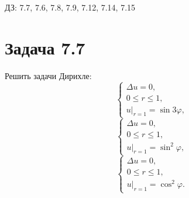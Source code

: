 \documentclass[11pt]{article}
\author{Sergey Makarov}
\date{\today}
\title{}
\def\zall{\setcounter{lem}{0}\setcounter{cnsqnc}{0}\setcounter{th}{0}\setcounter{Cmt}{0}\setcounter{equation}{0}}
\newcounter{lem}\setcounter{lem}{0}
\newcounter{th}\setcounter{th}{0}
\newcounter{cnsqnc}\setcounter{cnsqnc}{0}
\newcounter{Cmt}\setcounter{Cmt}{0}
\begin{document}
\zall

ДЗ: 7.7, 7.6, 7.8, 7.9, 7.12, 7.14, 7.15
\section{Задача 7.7}
\label{sec:org857e419}
Решить задачи Дирихле:
\begin{equation}
\begin{cases}
\Delta u = 0, \\
0 \leq r \leq 1, \\
u|_{r = 1} = \sin 3\varphi,
\end{cases}
\end{equation}
\begin{equation}
\begin{cases}
\Delta u = 0, \\
0 \leq r \leq 1, \\
u|_{r = 1} = \sin^2\varphi,
\end{cases}
\end{equation}
\begin{equation}
\begin{cases}
\Delta u = 0, \\
0 \leq r \leq 1, \\
u|_{r = 1} = \cos^2\varphi.
\end{cases}
\end{equation}
\end{document}
